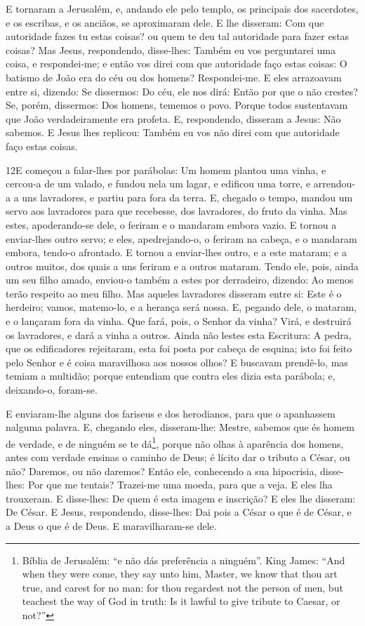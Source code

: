 E tornaram a Jerusalém, e, andando ele pelo templo, os principais
dos sacerdotes, e os escribas, e os anciãos, se aproximaram dele.
E lhe disseram: Com que autoridade fazes tu estas coisas? ou
quem te deu tal autoridade para fazer estas coisas? Mas
Jesus, respondendo, disse-lhes: Também eu vos perguntarei uma coisa,
e respondei-me; e então vos direi com que autoridade faço estas
coisas: O batismo de João era do céu ou dos homens?
Respondei-me. E eles arrazoavam entre si, dizendo: Se
dissermos: Do céu, ele nos dirá: Então por que o não crestes?
Se, porém, dissermos: Dos homens, tememos o povo. Porque
todos sustentavam que João verdadeiramente era profeta. E,
respondendo, disseram a Jesus: Não sabemos. E Jesus lhes replicou:
Também eu vos não direi com que autoridade faço estas coisas.

\medskip

\lettrine{12} E começou a falar-lhes por parábolas: Um homem
plantou uma vinha, e cercou-a de um valado, e fundou nela um lagar,
e edificou uma torre, e arrendou-a a uns lavradores, e partiu para
fora da terra. E, chegado o tempo, mandou um servo aos
lavradores para que recebesse, dos lavradores, do fruto da vinha.
Mas estes, apoderando-se dele, o feriram e o mandaram embora
vazio. E tornou a enviar-lhes outro servo; e eles,
apedrejando-o, o feriram na cabeça, e o mandaram embora, tendo-o
afrontado. E tornou a enviar-lhes outro, e a este mataram; e a
outros muitos, dos quais a uns feriram e a outros mataram. Tendo
ele, pois, ainda um seu filho amado, enviou-o também a estes por
derradeiro, dizendo: Ao menos terão respeito ao meu filho. Mas
aqueles lavradores disseram entre si: Este é o herdeiro; vamos,
matemo-lo, e a herança será nossa. E, pegando dele, o mataram, e
o lançaram fora da vinha. Que fará, pois, o Senhor da vinha?
Virá, e destruirá os lavradores, e dará a vinha a outros.
Ainda não lestes esta Escritura: A pedra, que os edificadores
rejeitaram, esta foi posta por cabeça de esquina; isto foi
feito pelo Senhor e é coisa maravilhosa aos nossos olhos? E
buscavam prendê-lo, mas temiam a multidão; porque entendiam que
contra eles dizia esta parábola; e, deixando-o, foram-se.

E enviaram-lhe alguns dos fariseus e dos herodianos, para que o
apanhassem nalguma palavra. E, chegando eles, disseram-lhe:
Mestre, sabemos que és homem de verdade, e de ninguém se te
dá\footnote{Bíblia de Jerusalém: ``e não dás preferência a
ninguém''. King James: ``And when they were come, they say unto him,
Master, we know that thou art true, and carest for no man: for thou
regardest not the person of men, but teachest the way of God in
truth: Is it lawful to give tribute to Caesar, or not?''}, porque
não olhas à aparência dos homens, antes com verdade ensinas o
caminho de Deus; é lícito dar o tributo a César, ou não? Daremos, ou
não daremos? Então ele, conhecendo a sua hipocrisia,
disse-lhes: Por que me tentais? Trazei-me uma moeda, para que a
veja. E eles lha trouxeram. E disse-lhes: De quem é esta
imagem e inscrição? E eles lhe disseram: De César. E Jesus,
respondendo, disse-lhes: Dai pois a César o que é de César, e a Deus
o que é de Deus. E maravilharam-se dele.

